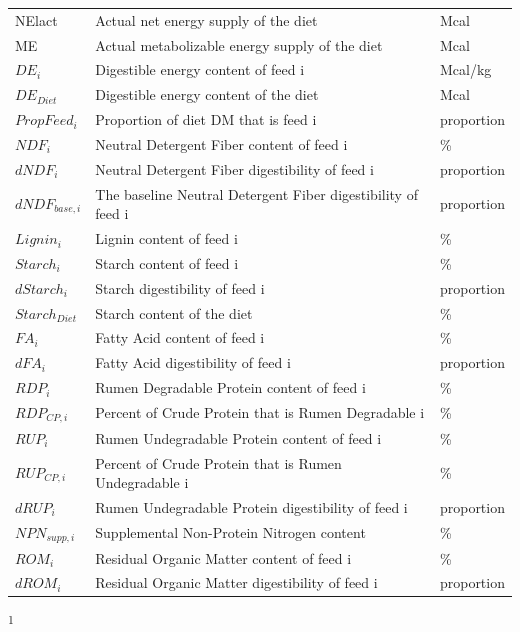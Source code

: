 \documentclass{article}
\begin{document}
\begin{refsection}
\begin{longtable}{@{} L{3.5cm} L{5.5cm} L{3.5cm} @{}}
NElact & Actual net energy supply of the diet& Mcal\\
ME & Actual metabolizable energy supply of the diet& Mcal\\
$DE_{i}$ & Digestible energy content of feed i & Mcal/kg\\
$DE_{Diet}$ & Digestible energy content of the diet & Mcal\\
$PropFeed_{i}$ & Proportion of diet DM that is feed i & proportion\\
$NDF_{i}$ & Neutral Detergent Fiber content of feed i & \% \\
$dNDF_{i}$ & Neutral Detergent Fiber digestibility of feed i & proportion\\
$dNDF_{base,i}$ & The baseline Neutral Detergent Fiber digestibility of feed i & proportion\\
$Lignin_{i}$ & Lignin content of feed i & \% \\
$Starch_{i}$ & Starch content of feed i & \% \\
$dStarch_{i}$ & Starch digestibility of feed i & proportion\\
$Starch_{Diet}$ & Starch content of the diet & \% \\
$FA_{i}$ & Fatty Acid content of feed i & \% \\
$dFA_{i}$ & Fatty Acid digestibility of feed i & proportion\\
$RDP_{i}$ & Rumen Degradable Protein content of feed i & \% \\
$RDP_{CP,i}$ & Percent of Crude Protein that is Rumen Degradable i & \% \\
$RUP_{i}$ & Rumen Undegradable Protein content of feed i & \%\\
$RUP_{CP,i}$ & Percent of Crude Protein that is Rumen Undegradable i & \% \\
$dRUP_{i}$ & Rumen Undegradable Protein digestibility of feed i & proportion\\
$NPN_{supp,i}$ & Supplemental Non-Protein Nitrogen content & \%\\
$ROM_{i}$ & Residual Organic Matter content of feed i & \% \\
$dROM_{i}$ & Residual Organic Matter digestibility of feed i & proportion\\

    \end{longtable}

{\textsuperscript{1} \cite{nrc2021}} 

\vspace{0.25cm}


\end{refsection}
\end{document}
